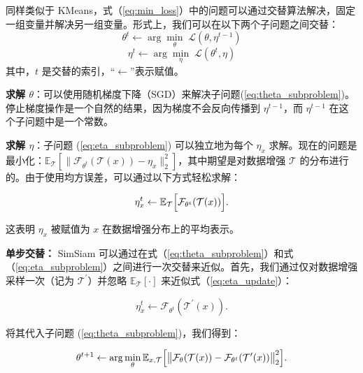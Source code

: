 \documentclass[master]{thesis-uestc}
\begin{document}
同样类似于 KMeans，式（\ref{eq:min_loss}）中的问题可以通过交替算法解决，固定一组变量并解决另一组变量。形式上，我们可以在以下两个子问题之间交替：
\begin{equation}
\label{eq:theta_subproblem}
\theta^{t} \leftarrow \arg\min_{\theta}\;\mathcal{L}(\theta,\eta^{t-1})
\end{equation}
\begin{equation}
\label{eq:eta_subproblem}
\eta^{t} \leftarrow \arg\min_{\eta}\;\mathcal{L}(\theta^{t},\eta)
\end{equation}
其中，$t$ 是交替的索引，“$\leftarrow$”表示赋值。

\textbf{求解 $\theta$}：可以使用随机梯度下降（SGD）来解决子问题(\ref{eq:theta_subproblem})。停止梯度操作是一个自然的结果，因为梯度不会反向传播到 $\eta^{t-1}$，而 $\eta^{t-1}$ 在这个子问题中是一个常数。

\textbf{求解 $\eta$}：子问题 (\ref{eq:eta_subproblem}) 可以独立地为每个 $\eta_{x}$ 求解。现在的问题是最小化：$\mathbb{E}_{\mathcal{T}}\left[\|\mathcal{F}_{\theta^{t}}(\mathcal{T}(x))-\eta_{x} \|_{2}^{2}\right]$，其中期望是对数据增强 $\mathcal{T}$ 的分布进行的。由于使用均方误差，可以通过以下方式轻松求解：

\begin{equation}
\label{eq:eta_update}
\eta_{x}^{t}\leftarrow\mathbb{E}_{\mathcal{T}}\Big{[}\mathcal{F}_{\theta^{t}}( \mathcal{T}(x))\Big{]}.
\end{equation}

这表明 $\eta_{x}$ 被赋值为 $x$ 在数据增强分布上的平均表示。

\textbf{单步交替：} SimSiam 可以通过在式（\ref{eq:theta_subproblem}）和式（\ref{eq:eta_subproblem}）之间进行一次交替来近似。首先，我们通过仅对数据增强采样一次（记为 $\mathcal{T}^{\prime}$）并忽略 $\mathbb{E}_{\mathcal{T}}[\cdot]$ 来近似式（\ref{eq:eta_update}）：

\begin{equation}
\label{eq:eta_approx}
\eta_{x}^{t}\leftarrow\mathcal{F}_{\theta^{t}}(\mathcal{T}^{\prime}(x)).
\end{equation}

将其代入子问题 (\ref{eq:theta_subproblem})，我们得到：

\begin{equation}
\label{eq:theta_update}
\theta^{t+1}\leftarrow\arg\min_{\theta}\mathbb{E}_{x,\mathcal{T}}\Big{[}\big{\| }\mathcal{F}_{\theta}(\mathcal{T}(x))-\mathcal{F}_{\theta^{t}}(\mathcal{T}^{ \prime}(x))\big{\|}_{2}^{2}\Big{]}.
\end{equation}
\end{document}
